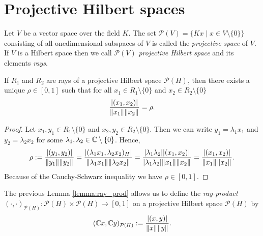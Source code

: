\section{Projective Hilbert spaces}

\begin{definition}
	Let $V$ be a vector space over the field $K$. The set $\mathcal{P}(V) = \{Kx \mid x \in V \setminus \{0\}\}$ consisting of all onedimensional subspaces of $V$ is called the \textit{projective space} of $V$. If $V$ is a Hilbert space then we call $\mathcal{P}(V)$ \textit{projective Hilbert space} and its elements \textit{rays}.
\end{definition}


\begin{lemma} \label{lemma:ray_prod}
	If $R_1$ and $R_2$ are rays of a projective Hilbert space $\mathcal{P}(H)$, then there exists a unique $\rho \in [0, 1]$ such that for all $x_1 \in R_1 \setminus \{0\}$ and $x_2 \in R_2 \setminus \{0\}$
	\begin{align*}
		\frac{\vbraces{(x_1, x_2)}}{\norm[]{x_1} \norm[]{x_2}} = \rho.
	\end{align*}
\end{lemma}

\begin{proof}
	Let $x_1, y_1 \in R_1 \setminus \{0\}$ and $x_2, y_2 \in R_2 \setminus \{0\}$. Then we can write $y_1 = \lambda_1 x_1$ and $y_2 = \lambda_2 x_2$ for some $\lambda_1, \lambda_2 \in \C \setminus \{0\}$. Hence,
	\begin{align*}
		\rho := \frac{\vbraces{(y_1, y_2)}}{\norm[]{y_1} \norm[]{y_2}} = \frac{\vbraces{(\lambda_1 x_1, \lambda_2 x_2)_H}}{\norm[]{\lambda_1 x_1} \norm[]{\lambda_2 x_2}} = \frac{\vbraces{\lambda_1 \lambda_2}\vbraces{(x_1, x_2)}}{\vbraces{\lambda_1 \lambda_2}\norm[]{x_1} \norm[]{x_2}} = \frac{\vbraces{(x_1, x_2)}}{\norm[]{x_1} \norm[]{x_2}}.
	\end{align*}
	Because of the Cauchy-Schwarz inequality we have $\rho \in [0,1]$. 
\end{proof}


\begin{definition}
	The previous Lemma \ref{lemma:ray_prod} allows us to define the \textit{ray-product} $(\cdot, \cdot)_{\mathcal{P}(H)}: \mathcal{P}(H) \times \mathcal{P}(H) \to [0,1]$ on a projective Hilbert space $\mathcal{P}(H)$ by
	\begin{align*}
		 (\C x, \C y)_{\mathcal{P}(H)} := \frac{\vbraces{(x, y)}}{\norm[]{x} \norm[]{y}}.
	\end{align*}
\end{definition}


